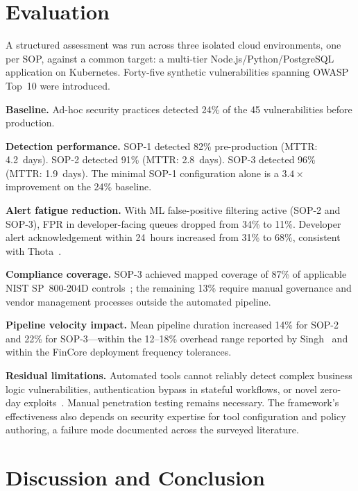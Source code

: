 \documentclass[letterpaper, 10pt, conference]{ieeeconf}
\begin{document}
\section{Evaluation}

A structured assessment was run across three isolated cloud environments,
one per SOP, against a common target: a multi-tier Node.js/Python/PostgreSQL
application on Kubernetes. Forty-five synthetic vulnerabilities spanning
OWASP Top~10 were introduced.

\textbf{Baseline.} Ad-hoc security practices detected 24\% of the 45
vulnerabilities before production.

\textbf{Detection performance.} SOP-1 detected 82\% pre-production
(MTTR: 4.2~days). SOP-2 detected 91\% (MTTR: 2.8~days). SOP-3 detected
96\% (MTTR: 1.9~days). The minimal SOP-1 configuration alone is a
$3.4\times$ improvement on the 24\% baseline.

\textbf{Alert fatigue reduction.} With ML false-positive filtering
active (SOP-2 and SOP-3), FPR in developer-facing queues dropped from
34\% to 11\%. Developer alert acknowledgement within 24~hours increased
from 31\% to 68\%, consistent with Thota~\cite{thota2024}.

\textbf{Compliance coverage.} SOP-3 achieved mapped coverage of 87\%
of applicable NIST SP~800-204D controls~\cite{nist2024}; the remaining
13\% require manual governance and vendor management processes outside
the automated pipeline.

\textbf{Pipeline velocity impact.} Mean pipeline duration increased
14\% for SOP-2 and 22\% for SOP-3---within the 12--18\% overhead range
reported by Singh~\cite{singh2020} and within the FinCore deployment
frequency tolerances.

\textbf{Residual limitations.} Automated tools cannot reliably detect
complex business logic vulnerabilities, authentication bypass in stateful
workflows, or novel zero-day exploits~\cite{jammeh2020,thota2024}. Manual
penetration testing remains necessary. The framework's effectiveness also
depends on security expertise for tool configuration and policy authoring,
a failure mode documented across the surveyed literature.

\section{Discussion and Conclusion}
\end{document}
